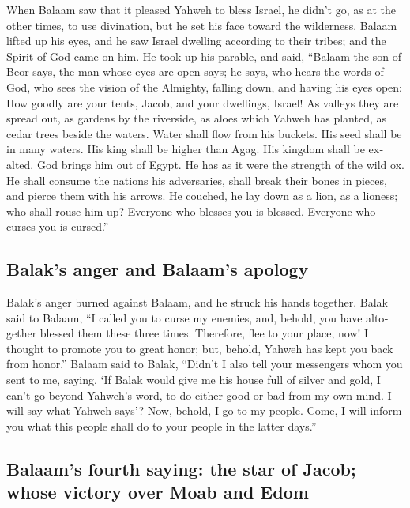 \begin{paracol}{2}
\begin{otherlanguage}{english}
 When Balaam saw that it pleased Yahweh to bless Israel,
he didn't go, as at the other times, to use divination, but he set his
face toward the wilderness.  Balaam lifted up his eyes,
and he saw Israel dwelling according to their tribes; and the Spirit of
God came on him.  He took up his parable, and said,
``Balaam the son of Beor says, the man whose eyes are open says;
 he says, who hears the words of God, who sees the vision
of the Almighty, falling down, and having his eyes open: 
How goodly are your tents, Jacob, and your dwellings, Israel!
 As valleys they are spread out, as gardens by the
riverside, as aloes which Yahweh has planted, as cedar trees beside the
waters.  Water shall flow from his buckets. His seed shall
be in many waters. His king shall be higher than Agag. His kingdom shall
be exalted.  God brings him out of Egypt. He has as it
were the strength of the wild ox. He shall consume the nations his
adversaries, shall break their bones in pieces, and pierce them with his
arrows.  He couched, he lay down as a lion, as a lioness;
who shall rouse him up? Everyone who blesses you is blessed. Everyone
who curses you is cursed.''

\hypertarget{balaks-anger-and-balaams-apology}{%
\subsection{Balak's anger and Balaam's
apology}\label{balaks-anger-and-balaams-apology}}

 Balak's anger burned against Balaam, and he struck his
hands together. Balak said to Balaam, ``I called you to curse my
enemies, and, behold, you have altogether blessed them these three
times.  Therefore, flee to your place, now! I thought to
promote you to great honor; but, behold, Yahweh has kept you back from
honor.''  Balaam said to Balak, ``Didn't I also tell your
messengers whom you sent to me, saying,  `If Balak would
give me his house full of silver and gold, I can't go beyond Yahweh's
word, to do either good or bad from my own mind. I will say what Yahweh
says'?  Now, behold, I go to my people. Come, I will
inform you what this people shall do to your people in the latter
days.''

\hypertarget{balaams-fourth-saying-the-star-of-jacob-whose-victory-over-moab-and-edom}{%
\subsection{Balaam's fourth saying: the star of Jacob; whose victory
over Moab and
Edom}\label{balaams-fourth-saying-the-star-of-jacob-whose-victory-over-moab-and-edom}}


\end{otherlanguage}
\end{paracol}
